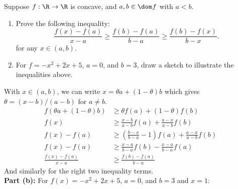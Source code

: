 \documentclass[11pt]{article}
\begin{document}
\makeAssignmentTitle

\begin{homeworkProblem}
    Suppose $f : \R \rightarrow \R$ is concave, and $a, b \in \dom f$ with $a < b$.
    \begin{enumerate}[label=(\alph*), topsep=5pt, itemsep=5pt]
        \item Prove the following inequality:
              \[
                  \frac{f(x) - f(a)}{x - a} \geq \frac{f(b) - f(a)}{b - a} \geq \frac{f(b) - f(x)}{b - x}.
              \]
              for any $x \in (a, b)$.
        \item For $f = -x^2 + 2x + 5$, $a = 0$, and $b = 3$, draw a sketch to illustrate the inequalities above.
    \end{enumerate} \vspace{1\baselineskip}

    \solution

    With $x \in (a, b)$, we can write $x = \theta a + (1-\theta) b$ which gives $\theta = (x-b)/(a-b)$ for $a\neq b$.
    \begin{align*}
        f(\theta a + (1-\theta) b) & \geq \theta f(a) + (1-\theta) f(b)                             \\
        f(x)                       & \geq \frac{x-b}{a-b} f(a) + \frac{a-x}{a-b} f(b)               \\
        f(x) - f(a)                & \geq \left(\frac{b-x}{b-a}-1\right) f(a) + \frac{a-x}{a-b}f(b) \\
        f(x) - f(a)                & \geq \frac{x - a}{b - a} f(b) - \frac{x - a}{b - a} f(a)       \\
        \frac{f(x) - f(a)}{x - a}  & \geq \frac{f(b) - f(a)}{b - a}
    \end{align*}
    And similarly for the right two inequality terms. \\

    \textbf{Part (b):} For $f(x) = -x^2 + 2x + 5$, $a = 0$, and $b = 3$ and $x = 1$:
    \begin{figure}[hbpt!]
        \vspace{\baselineskip}
        \centering
\end{figure}
\end{homeworkProblem}
\end{document}
